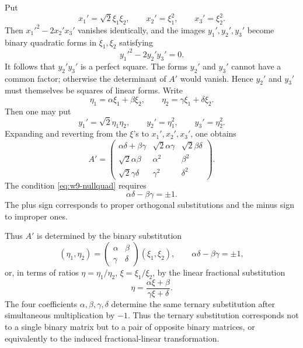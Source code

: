 \documentclass[11pt]{article}
\begin{document}
Put
\begin{equation}\label{eq:w9-xi}
 x_1'=\sqrt2\xi_1\xi_2,
 \qquad x_2'=\xi_1^2,
 \qquad x_3'=\xi_2^2.
\end{equation}
Then $x_1'^2-2x_2'x_3'$ vanishes identically, and the images $y_1',y_2',y_3'$ become binary quadratic forms in $\xi_1,\xi_2$ satisfying
\begin{equation}\label{eq:w9-y-null}
 y_1'^2-2y_2'y_3'=0.
\end{equation}
It follows that $y_2'y_3'$ is a perfect square.  The forms $y_2'$ and $y_3'$ cannot have a common factor; otherwise the determinant of $A'$ would vanish.  Hence $y_2'$ and $y_3'$ must themselves be squares of linear forms.  Write
\begin{equation}\label{eq:w9-eta}
 \eta_1=\alpha\xi_1+\beta\xi_2,
 \qquad
 \eta_2=\gamma\xi_1+\delta\xi_2.
\end{equation}
Then one may put
\begin{equation}\label{eq:w9-yeta}
 y_1'=\sqrt2\eta_1\eta_2,
 \qquad y_2'=\eta_1^2,
 \qquad y_3'=\eta_2^2.
\end{equation}
Expanding and reverting from the $\xi$'s to $x_1',x_2',x_3'$, one obtains
\begin{equation}\label{eq:w9-Apmat}
 A'=\begin{pmatrix}
 \alpha\delta+\beta\gamma&\sqrt2\alpha\gamma&\sqrt2\beta\delta\\
 \sqrt2\alpha\beta&\alpha^2&\beta^2\\
 \sqrt2\gamma\delta&\gamma^2&\delta^2
 \end{pmatrix}.
\end{equation}
The condition \eqref{eq:w9-nullquad} requires
\begin{equation}\label{eq:w9-detpm}
 \alpha\delta-\beta\gamma=\pm1.
\end{equation}
The plus sign corresponds to proper orthogonal substitutions and the minus sign to improper ones.

Thus $A'$ is determined by the binary substitution
\begin{equation}\label{eq:w9-bin}
 (\eta_1,\eta_2)=
 \begin{pmatrix}\alpha&\beta\\ \gamma&\delta\end{pmatrix}
 (\xi_1,\xi_2),
\qquad \alpha\delta-\beta\gamma=\pm1,
\end{equation}
or, in terms of ratios $\eta=\eta_1/\eta_2$, $\xi=\xi_1/\xi_2$, by the linear fractional substitution
\begin{equation}\label{eq:w9-frac}
 \eta=\frac{\alpha\xi+\beta}{\gamma\xi+\delta}.
\end{equation}
The four coefficients $\alpha,\beta,\gamma,\delta$ determine the same ternary substitution after simultaneous multiplication by $-1$.  Thus the ternary substitution corresponds not to a single binary matrix but to a pair of opposite binary matrices, or equivalently to the induced fractional-linear transformation.
\end{document}
